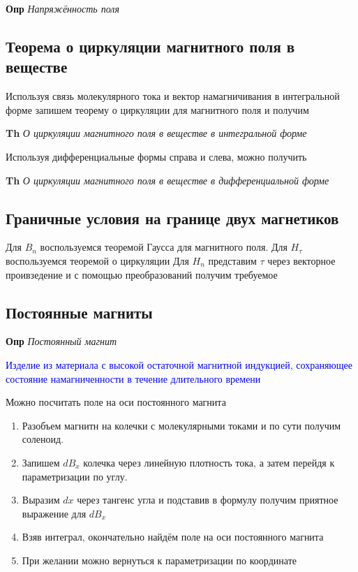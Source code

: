 \documentclass[a4paper, 14pt]{article}
\begin{document}
    \textbf{Опр} \textit{Напряжённость поля}
    
    \subsection{Теорема о циркуляции магнитного поля в веществе}
    
    Используя связь молекулярного тока и вектор намагничивания в интегральной форме запишем теорему о циркуляции для
    магнитного поля и получим
    
    \textbf{Th} \textit{О циркуляции магнитного поля в веществе в интегральной форме}
    
    Используя дифференциальные формы справа и слева, можно получить
    
    \textbf{Th} \textit{О циркуляции магнитного поля в веществе в дифференциальной форме}
    
    \subsection{Граничные условия на границе двух магнетиков}
    
    Для $B_n$ воспользуемся теоремой Гаусса для магнитного поля.
    Для $H_\tau$ воспользуемся теоремой о циркуляции
    Для $H_n$ представим $\tau$ через векторное проивзедение и с помощью преобразований получим требуемое
    
    \subsection{Постоянные магниты}
    
    \textbf{Опр} \textit{Постоянный магнит}
    
    \textcolor{blue}{Изделие из материала с высокой остаточной магнитной индукцией, сохраняющее состояние
    намагниченности в течение длительного времени}
    
    Можно посчитать поле на оси постоянного магнита
    
    \begin{enumerate}
        \item Разобъем магнитн на колечки с молекулярными токами и по сути получим соленоид.
        \item Запишем $dB_x$ колечка через линейную плотность тока, а затем перейдя к параметризации по углу.
        \item Выразим $dx$ через тангенс угла и подставив в формулу получим приятное выражение для $dB_x$
        \item Взяв интеграл, окончательно найдём поле на оси постоянного магнита
        \item При желании можно вернуться к параметризации по координате
    \end{enumerate}
    
\end{document}
